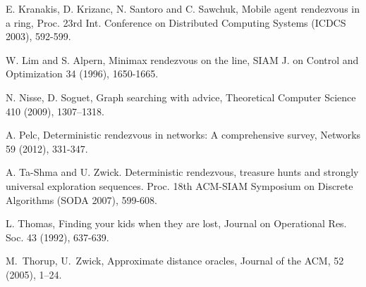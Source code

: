 \documentclass{llncs}
\begin{document}
\begin{thebibliography}{12}
E. Kranakis, D. Krizanc, N. Santoro and C. Sawchuk, 
Mobile agent rendezvous in a ring, 
Proc. 23rd Int. Conference on Distributed Computing Systems
(ICDCS 2003), 592-599.

W. Lim and S. Alpern,
Minimax rendezvous on the line,
SIAM J. on Control and Optimization 34 (1996), 1650-1665.



N. Nisse, D. Soguet, Graph searching with advice,
Theoretical Computer Science 410 (2009), 1307--1318.



A. Pelc, Deterministic rendezvous in networks: A comprehensive survey, 
Networks 59 (2012), 331-347. 




A. Ta-Shma and U. Zwick.
Deterministic rendezvous, treasure hunts and strongly universal exploration sequences.
Proc. 18th ACM-SIAM Symposium on Discrete Algorithms (SODA 2007), 599-608.

L. Thomas,
Finding your kids when they are lost,
Journal on Operational Res. Soc. 43 (1992), 637-639.

M.~Thorup, U.~Zwick, Approximate distance oracles,
Journal of the ACM, 52 (2005), 1--24.







\end{thebibliography}
\end{document}
